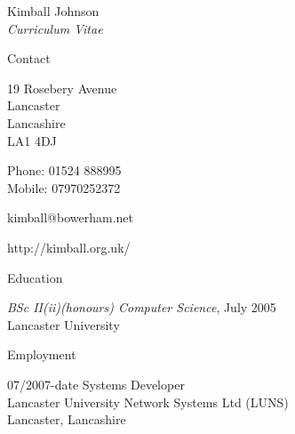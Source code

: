 \documentclass[10pt]{article}
\begin{document}
\newlength{\oldcvlabelwidth}
\renewcommand*{\cvbibname}{}

\begin{cv}{Kimball Johnson\\{\large \itshape Curriculum Vitae}}

\begin{cvlist}{Contact}
	\item
	19 Rosebery Avenue\\
	Lancaster\\
	Lancashire\\
	LA1 4DJ
	\item Phone: 01524 888995\\
	Mobile: 07970252372
	\item kimball@bowerham.net
	\item http://kimball.org.uk/
\end{cvlist}

\begin{cvlist}{Education}
	\item \emph{BSc II(ii)(honours) Computer Science}, July 2005\\
	Lancaster University
\end{cvlist}

\pagebreak

\begin{cvlist}{Employment}
	\item[07/2007-date] Systems Developer\\
	Lancaster University Network Systems Ltd (LUNS)\\
	Lancaster, Lancashire
\end{cvlist}

\setlength{\oldcvlabelwidth}{\cvlabelwidth}
\setlength{\cvlabelwidth}{1em}
\renewcommand*{\bibindent}{1.5em}


\end{cv}
\end{document}
